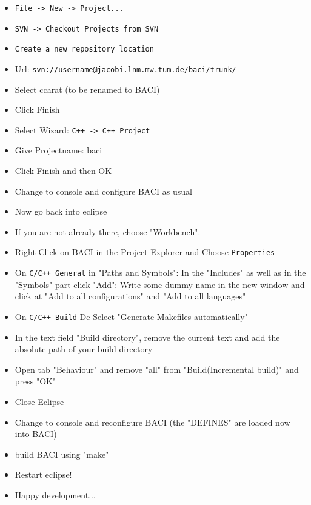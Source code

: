 \begin{itemize}
\item \texttt{File -> New -> Project...}
\item  \texttt{SVN -> Checkout Projects from SVN}
\item  \texttt{Create a new repository location}
\item  Url: \texttt{svn://username@jacobi.lnm.mw.tum.de/baci/trunk/}

\item Select ccarat (to be renamed to BACI)

\item Click Finish

\item Select Wizard: \texttt{C++ -> C++ Project}

\item Give Projectname: baci

\item Click Finish and then OK

\item Change to console and configure BACI as usual

\item Now go back into eclipse

\item If you are not already there, choose "Workbench".

\item Right-Click on BACI in the Project Explorer and Choose \texttt{Properties}

\item On \texttt{C/C++ General} in "Paths and Symbols":
	In the "Includes" as well as in the "Symbols" part click "Add":
	Write some dummy name in the new window and click at "Add to all configurations" and "Add to all languages"

\item On \texttt{C/C++ Build} De-Select "Generate Makefiles automatically"

\item In the text field "Build directory", remove the current text and add the absolute path of your build directory

\item Open tab "Behaviour" and remove "all" from "Build(Incremental build)" and press "OK"

\item Close Eclipse

\item Change to console and reconfigure BACI (the "DEFINES" are loaded now into BACI)

\item build BACI using "make"

\item Restart eclipse!

\item Happy development...

\end{itemize}

